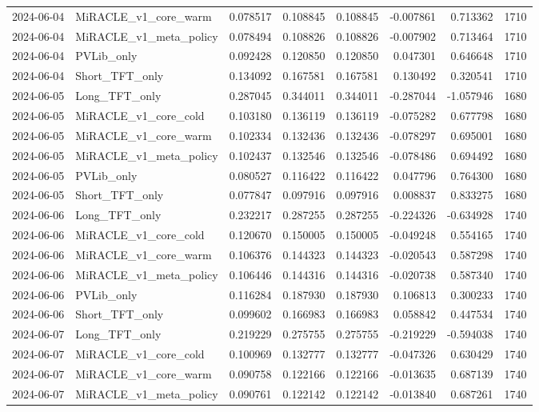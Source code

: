 \begin{tabular}{llrrrrrr}
2024-06-04 & MiRACLE_v1_core_warm & 0.078517 & 0.108845 & 0.108845 & -0.007861 & 0.713362 & 1710 \\
2024-06-04 & MiRACLE_v1_meta_policy & 0.078494 & 0.108826 & 0.108826 & -0.007902 & 0.713464 & 1710 \\
2024-06-04 & PVLib_only & 0.092428 & 0.120850 & 0.120850 & 0.047301 & 0.646648 & 1710 \\
2024-06-04 & Short_TFT_only & 0.134092 & 0.167581 & 0.167581 & 0.130492 & 0.320541 & 1710 \\
2024-06-05 & Long_TFT_only & 0.287045 & 0.344011 & 0.344011 & -0.287044 & -1.057946 & 1680 \\
2024-06-05 & MiRACLE_v1_core_cold & 0.103180 & 0.136119 & 0.136119 & -0.075282 & 0.677798 & 1680 \\
2024-06-05 & MiRACLE_v1_core_warm & 0.102334 & 0.132436 & 0.132436 & -0.078297 & 0.695001 & 1680 \\
2024-06-05 & MiRACLE_v1_meta_policy & 0.102437 & 0.132546 & 0.132546 & -0.078486 & 0.694492 & 1680 \\
2024-06-05 & PVLib_only & 0.080527 & 0.116422 & 0.116422 & 0.047796 & 0.764300 & 1680 \\
2024-06-05 & Short_TFT_only & 0.077847 & 0.097916 & 0.097916 & 0.008837 & 0.833275 & 1680 \\
2024-06-06 & Long_TFT_only & 0.232217 & 0.287255 & 0.287255 & -0.224326 & -0.634928 & 1740 \\
2024-06-06 & MiRACLE_v1_core_cold & 0.120670 & 0.150005 & 0.150005 & -0.049248 & 0.554165 & 1740 \\
2024-06-06 & MiRACLE_v1_core_warm & 0.106376 & 0.144323 & 0.144323 & -0.020543 & 0.587298 & 1740 \\
2024-06-06 & MiRACLE_v1_meta_policy & 0.106446 & 0.144316 & 0.144316 & -0.020738 & 0.587340 & 1740 \\
2024-06-06 & PVLib_only & 0.116284 & 0.187930 & 0.187930 & 0.106813 & 0.300233 & 1740 \\
2024-06-06 & Short_TFT_only & 0.099602 & 0.166983 & 0.166983 & 0.058842 & 0.447534 & 1740 \\
2024-06-07 & Long_TFT_only & 0.219229 & 0.275755 & 0.275755 & -0.219229 & -0.594038 & 1740 \\
2024-06-07 & MiRACLE_v1_core_cold & 0.100969 & 0.132777 & 0.132777 & -0.047326 & 0.630429 & 1740 \\
2024-06-07 & MiRACLE_v1_core_warm & 0.090758 & 0.122166 & 0.122166 & -0.013635 & 0.687139 & 1740 \\
2024-06-07 & MiRACLE_v1_meta_policy & 0.090761 & 0.122142 & 0.122142 & -0.013840 & 0.687261 & 1740 \\

\end{tabular}
